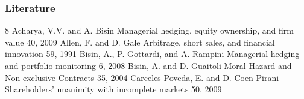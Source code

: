 \documentclass[blue]{beamer}
\theoremstyle{definition}
\theoremstyle{example}
\begin{document}
\begin{frame}\frametitle{Literature}
{\small
\begin{thebibliography}{8}
  \beamertemplatearticlebibitems
    Acharya, V.V. and A. Bisin
    \newblock Managerial hedging, equity ownership, and firm value
     40, 2009
    Allen, F. and D. Gale
    \newblock Arbitrage, short sales, and financial innovation
     59, 1991
    Bisin, A., P. Gottardi, and A. Rampini
    \newblock Managerial hedging and portfolio monitoring
     6, 2008
    Bisin, A. and D. Guaitoli
    \newblock Moral Hazard and Non-exclusive Contracts
     35, 2004
    Carceles-Poveda, E. and D. Coen-Pirani
    \newblock Shareholders' unanimity with incomplete markets
     50, 2009
    \end{thebibliography}
}
\end{frame}
\end{document}
